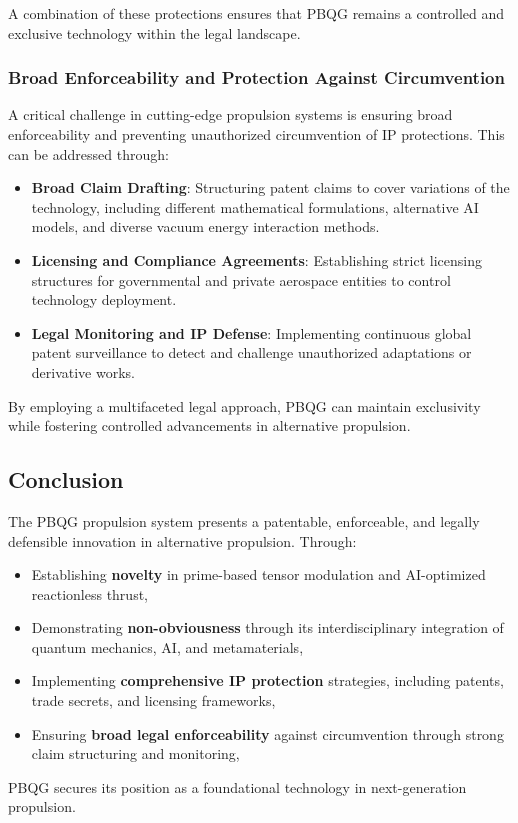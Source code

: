 \documentclass{article}
\theoremstyle{plain}
\begin{document}
A combination of these protections ensures that PBQG remains a controlled and exclusive technology within the legal landscape.

\subsubsection{Broad Enforceability and Protection Against Circumvention}
\label{subsubsec:enforceability}

A critical challenge in cutting-edge propulsion systems is ensuring broad enforceability and preventing unauthorized circumvention of IP protections. This can be addressed through:
\begin{itemize}
    \item \textbf{Broad Claim Drafting}: Structuring patent claims to cover variations of the technology, including different mathematical formulations, alternative AI models, and diverse vacuum energy interaction methods.
    \item \textbf{Licensing and Compliance Agreements}: Establishing strict licensing structures for governmental and private aerospace entities to control technology deployment.
    \item \textbf{Legal Monitoring and IP Defense}: Implementing continuous global patent surveillance to detect and challenge unauthorized adaptations or derivative works.
\end{itemize}

By employing a multifaceted legal approach, PBQG can maintain exclusivity while fostering controlled advancements in alternative propulsion.

\subsection{Conclusion}
\label{subsec:legal_conclusion}

The PBQG propulsion system presents a patentable, enforceable, and legally defensible innovation in alternative propulsion. Through:
\begin{itemize}
    \item Establishing \textbf{novelty} in prime-based tensor modulation and AI-optimized reactionless thrust,
    \item Demonstrating \textbf{non-obviousness} through its interdisciplinary integration of quantum mechanics, AI, and metamaterials,
    \item Implementing \textbf{comprehensive IP protection} strategies, including patents, trade secrets, and licensing frameworks,
    \item Ensuring \textbf{broad legal enforceability} against circumvention through strong claim structuring and monitoring,
\end{itemize}
PBQG secures its position as a foundational technology in next-generation propulsion.
\end{document}
